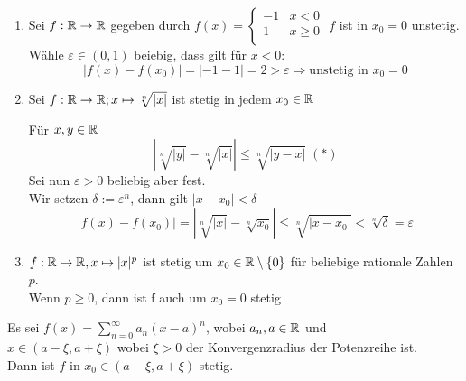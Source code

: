 \documentclass[../ana1u.tex]{subfiles}
\begin{document}
\begin{bspe}
    \begin{enumerate}
        \item Sei \(f: \mathbb{R} \rightarrow \mathbb{R} \) gegeben durch \(f(x) = \left\{
            \begin{array}{ll}
            -1 & x < 0 \\
            1 & x \geq 0 \\
            \end{array}
            \right.\)
            \(f\) ist in \(x_0 = 0 \) unstetig. Wähle \(\varepsilon \in (0,1) \) beiebig, dass gilt für \(x < 0 \):
            \[|f(x)-f(x_0)| = |-1-1| = 2 > \varepsilon \Rightarrow \text{unstetig in } x_0 = 0 \]
        \item Sei \(f: \mathbb{R} \rightarrow \mathbb{R}; x \mapsto \sqrt[n]{|x|} \) ist stetig in jedem \(x_0 \in \mathbb{R} \)
            \begin{bew}
                Für \(x,y \in \mathbb{R} \)
                \[|\sqrt[n]{|y|}-\sqrt[n]{|x|}| \leq \sqrt[n]{|y-x|} \; (*) \]
                Sei nun \(\varepsilon > 0 \) beliebig aber fest. \\
                Wir setzen \(\delta := \varepsilon^n \), dann gilt \(|x-x_0|<\delta \)
                \[|f(x)-f(x_0)| = |\sqrt[n]{|x|} - \sqrt[n]{x_0}| \leq \sqrt[n]{|x-x_0|} < \sqrt[n]{\delta} = \varepsilon \]
            \end{bew}
        \item \(f: \mathbb{R} \rightarrow \mathbb{R}, x \mapsto |x|^p \) ist stetig um \(x_0 \in \mathbb{R} \setminus \{0\} \) 
        für beliebige rationale Zahlen \(p\). \\
        Wenn \(p \geq 0 \), dann ist f auch um \(x_0 = 0 \) stetig
    \end{enumerate}
\end{bspe}
\begin{satz}
    Es sei \(f(x) = \sum_{n=0}^{\infty} a_n(x-a)^n \), wobei \(a_n,a \in \mathbb{R} \) und \\
    \(x \in (a - \xi, a + \xi) \) wobei \(\xi > 0 \) der Konvergenzradius der Potenzreihe ist. \\
    Dann ist \(f\) in \(x_0 \in (a-\xi, a+\xi) \) stetig.
\end{satz}
\end{document}
